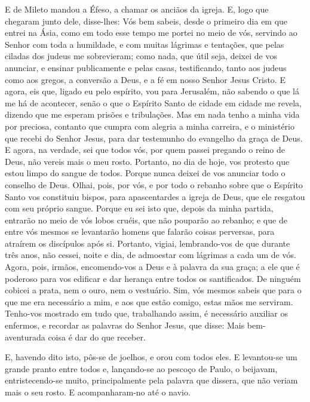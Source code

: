 E de Mileto mandou a Éfeso, a chamar os anciãos da igreja.
E, logo que chegaram junto dele, disse-lhes: Vós bem sabeis,
desde o primeiro dia em que entrei na Ásia, como em todo esse tempo
me portei no meio de vós, servindo ao Senhor com toda a
humildade, e com muitas lágrimas e tentações, que pelas ciladas dos
judeus me sobrevieram; como nada, que útil seja, deixei de
vos anunciar, e ensinar publicamente e pelas casas,
testificando, tanto aos judeus como aos gregos, a conversão a
Deus, e a fé em nosso Senhor Jesus Cristo. E agora, eis que,
ligado eu pelo espírito, vou para Jerusalém, não sabendo o que lá me
há de acontecer, senão o que o Espírito Santo de cidade em
cidade me revela, dizendo que me esperam prisões e tribulações.
Mas em nada tenho a minha vida por preciosa, contanto que
cumpra com alegria a minha carreira, e o ministério que recebi do
Senhor Jesus, para dar testemunho do evangelho da graça de Deus.
E agora, na verdade, sei que todos vós, por quem passei
pregando o reino de Deus, não vereis mais o meu rosto.
Portanto, no dia de hoje, vos protesto que estou limpo do
sangue de todos. Porque nunca deixei de vos anunciar todo o
conselho de Deus. Olhai, pois, por vós, e por todo o rebanho
sobre que o Espírito Santo vos constituiu bispos, para apascentardes
a igreja de Deus, que ele resgatou com seu próprio sangue.
Porque eu sei isto que, depois da minha partida, entrarão no
meio de vós lobos cruéis, que não pouparão ao rebanho; e que
de entre vós mesmos se levantarão homens que falarão coisas
perversas, para atraírem os discípulos após si. Portanto,
vigiai, lembrando-vos de que durante três anos, não cessei, noite e
dia, de admoestar com lágrimas a cada um de vós. Agora, pois,
irmãos, encomendo-vos a Deus e à palavra da sua graça; a ele que é
poderoso para vos edificar e dar herança entre todos os
santificados. De ninguém cobicei a prata, nem o ouro, nem o
vestuário. Sim, vós mesmos sabeis que para o que me era
necessário a mim, e aos que estão comigo, estas mãos me serviram.
Tenho-vos mostrado em tudo que, trabalhando assim, é
necessário auxiliar os enfermos, e recordar as palavras do Senhor
Jesus, que disse: Mais bem-aventurada coisa é dar do que receber.

E, havendo dito isto, pôs-se de joelhos, e orou com todos eles.
E levantou-se um grande pranto entre todos e, lançando-se ao
pescoço de Paulo, o beijavam, entristecendo-se muito,
principalmente pela palavra que dissera, que não veriam mais o seu
rosto. E acompanharam-no até o navio.

\medskip

